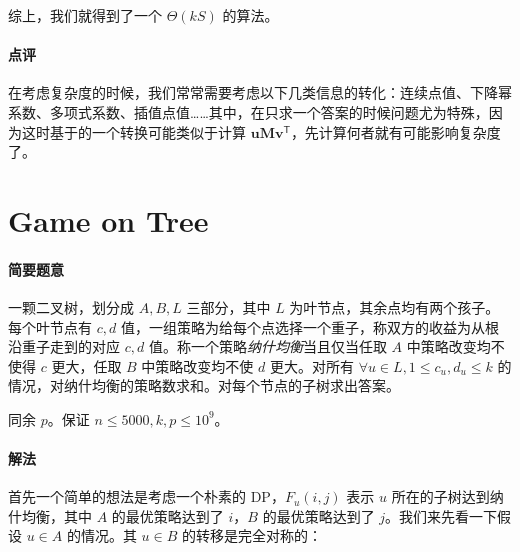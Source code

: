 \documentclass[12pt]{ctexart}
\theoremstyle{theorem}
\theoremstyle{theorem}
\begin{document}
综上，我们就得到了一个 $\Theta(kS)$ 的算法。

\paragraph{点评} 在考虑复杂度的时候，我们常常需要考虑以下几类信息的转化：连续点值、下降幂系数、多项式系数、插值点值……其中，在只求一个答案的时候问题尤为特殊，因为这时基于的一个转换可能类似于计算 $\mathbf {uM}\mathbf v^{\mathsf T}$，先计算何者就有可能影响复杂度了。

\newpage

\section{Game on Tree}

\paragraph{简要题意}

一颗二叉树，划分成 $A,B,L$ 三部分，其中 $L$ 为叶节点，其余点均有两个孩子。每个叶节点有 $c,d$ 值，一组策略为给每个点选择一个重子，称双方的收益为从根沿重子走到的对应 $c,d$ 值。称一个策略\emph{纳什均衡}当且仅当任取 $A$ 中策略改变均不使得 $c$ 更大，任取 $B$ 中策略改变均不使 $d$ 更大。对所有 $\forall u\in L,1\le c_u,d_u\le k$ 的情况，对纳什均衡的策略数求和。对每个节点的子树求出答案。

同余 $p$。保证 $n\le 5000, k,p\le 10^9$。

\paragraph{解法}

首先一个简单的想法是考虑一个朴素的 DP，$F_u(i, j)$ 表示 $u$ 所在的子树达到纳什均衡，其中 $A$ 的最优策略达到了 $i$，$B$ 的最优策略达到了 $j$。我们来先看一下假设 $u\in A$ 的情况。其 $u\in B$ 的转移是完全对称的：
\end{document}
